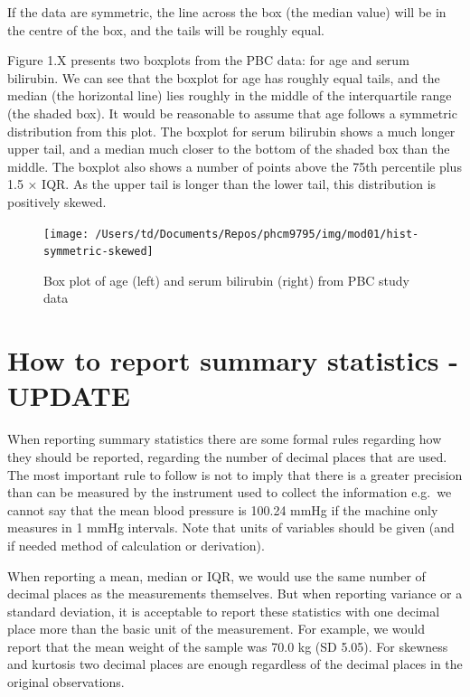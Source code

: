 \documentclass[
]{memoir}
\begin{document}
If the data are symmetric, the line across the box (the median value) will be in the centre of the box, and the tails will be roughly equal.

Figure 1.X presents two boxplots from the PBC data: for age and serum bilirubin. We can see that the boxplot for age has roughly equal tails, and the median (the horizontal line) lies roughly in the middle of the interquartile range (the shaded box). It would be reasonable to assume that age follows a symmetric distribution from this plot. The boxplot for serum bilirubin shows a much longer upper tail, and a median much closer to the bottom of the shaded box than the middle. The boxplot also shows a number of points above the 75th percentile plus 1.5 × IQR. As the upper tail is longer than the lower tail, this distribution is positively skewed.

\begin{figure}
\texttt{[image: /Users/td/Documents/Repos/phcm9795/img/mod01/hist-symmetric-skewed]} \caption{Box plot of age (left) and serum bilirubin (right) from PBC study data}\label{fig:fig-1-7}
\end{figure}

\hypertarget{how-to-report-summary-statistics---update}{%
\section{How to report summary statistics - UPDATE}\label{how-to-report-summary-statistics---update}}

When reporting summary statistics there are some formal rules regarding how they should be reported, regarding the number of decimal places that are used. The most important rule to follow is not to imply that there is a greater precision than can be measured by the instrument used to collect the information e.g.~we cannot say that the mean blood pressure is 100.24 mmHg if the machine only measures in 1 mmHg intervals. Note that units of variables should be given (and if needed method of calculation or derivation).

When reporting a mean, median or IQR, we would use the same number of decimal places as the measurements themselves. But when reporting variance or a standard deviation, it is acceptable to report these statistics with one decimal place more than the basic unit of the measurement. For example, we would report that the mean weight of the sample was 70.0 kg (SD 5.05). For skewness and kurtosis two decimal places are enough regardless of the decimal places in the original observations.
\end{document}
